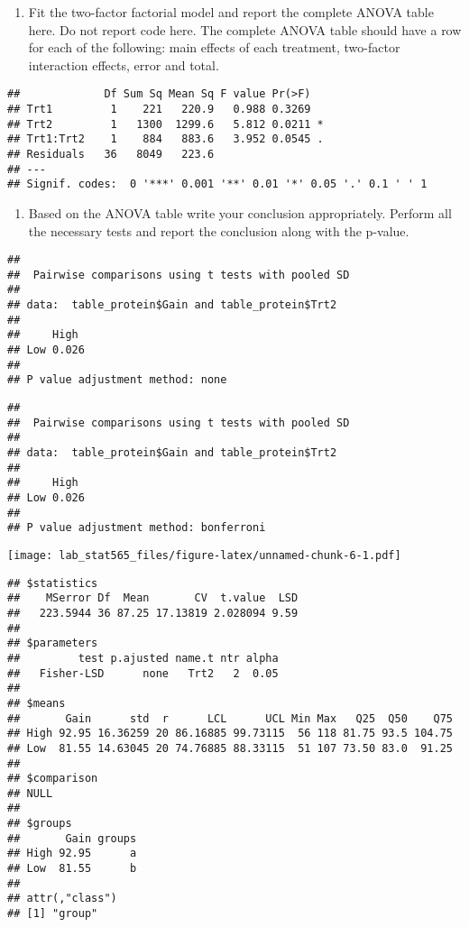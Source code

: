 \documentclass[]{article}
\providecommand{\tightlist}{%
  \setlength{\itemsep}{0pt}\setlength{\parskip}{0pt}}
\begin{document}
\begin{enumerate}
\def\labelenumi{(\alph{enumi})}
\setcounter{enumi}{2}
\tightlist
\item
  Fit the two-factor factorial model and report the complete ANOVA table
  here. Do not report code here. The complete ANOVA table should have a
  row for each of the following: main effects of each treatment,
  two-factor interaction effects, error and total.
\end{enumerate}

\begin{verbatim}
##             Df Sum Sq Mean Sq F value Pr(>F)  
## Trt1         1    221   220.9   0.988 0.3269  
## Trt2         1   1300  1299.6   5.812 0.0211 *
## Trt1:Trt2    1    884   883.6   3.952 0.0545 .
## Residuals   36   8049   223.6                 
## ---
## Signif. codes:  0 '***' 0.001 '**' 0.01 '*' 0.05 '.' 0.1 ' ' 1
\end{verbatim}

\begin{enumerate}
\def\labelenumi{(\alph{enumi})}
\setcounter{enumi}{3}
\tightlist
\item
  Based on the ANOVA table write your conclusion appropriately. Perform
  all the necessary tests and report the conclusion along with the
  p-value.
\end{enumerate}

\begin{verbatim}
## 
##  Pairwise comparisons using t tests with pooled SD 
## 
## data:  table_protein$Gain and table_protein$Trt2 
## 
##     High 
## Low 0.026
## 
## P value adjustment method: none
\end{verbatim}

\begin{verbatim}
## 
##  Pairwise comparisons using t tests with pooled SD 
## 
## data:  table_protein$Gain and table_protein$Trt2 
## 
##     High 
## Low 0.026
## 
## P value adjustment method: bonferroni
\end{verbatim}

\texttt{[image: lab\_stat565\_files/figure-latex/unnamed-chunk-6-1.pdf]}

\begin{verbatim}
## $statistics
##    MSerror Df  Mean       CV  t.value  LSD
##   223.5944 36 87.25 17.13819 2.028094 9.59
## 
## $parameters
##         test p.ajusted name.t ntr alpha
##   Fisher-LSD      none   Trt2   2  0.05
## 
## $means
##       Gain      std  r      LCL      UCL Min Max   Q25  Q50    Q75
## High 92.95 16.36259 20 86.16885 99.73115  56 118 81.75 93.5 104.75
## Low  81.55 14.63045 20 74.76885 88.33115  51 107 73.50 83.0  91.25
## 
## $comparison
## NULL
## 
## $groups
##       Gain groups
## High 92.95      a
## Low  81.55      b
## 
## attr(,"class")
## [1] "group"
\end{verbatim}
\end{document}
